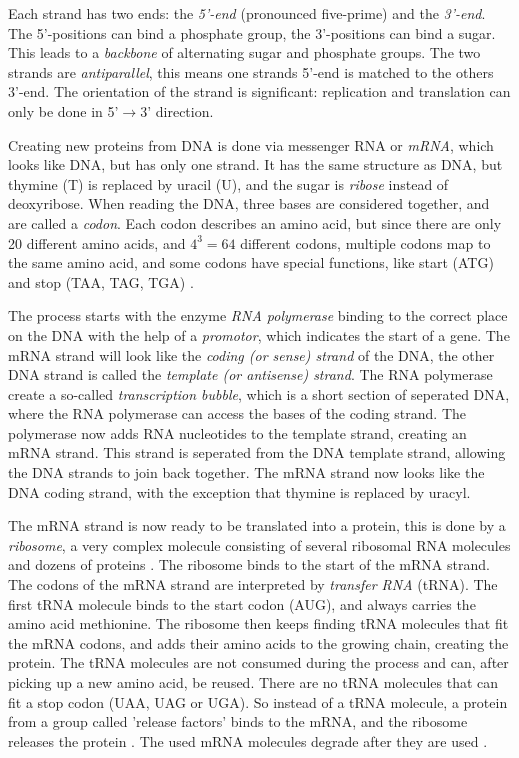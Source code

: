 \documentclass[../main/thesis.tex]{subfiles}
\begin{document}

Each strand has two ends: the \textit{5'-end} (pronounced five-prime) and the \textit{3'-end}.
The 5'-positions can bind a phosphate group, the 3'-positions can bind a sugar.
This leads to a \textit{backbone} of alternating sugar and phosphate groups.
The two strands are \textit{antiparallel}, this means one strands 5'-end is matched to the others 3'-end.
The orientation of the strand is significant: replication and translation can only be done in 5'$\rightarrow$3' direction.

Creating new proteins from DNA is done via messenger RNA or \textit{mRNA}, which looks like DNA, but has only one strand.
It has the same structure as DNA, but thymine (T) is replaced by uracil (U), and the sugar is \textit{ribose} instead of deoxyribose.
When reading the DNA, three bases are considered together, and are called a \textit{codon}.
Each codon describes an amino acid, but since there are only 20 different amino acids, and $4^3=64$ different codons, multiple codons map to the same amino acid, and some codons have special functions, like start (ATG) and stop (TAA, TAG, TGA) \cite{codons}.

The process starts with the enzyme \textit{RNA polymerase} binding to the correct place on the DNA with the help of a \textit{promotor}, which indicates the start of a gene.
The mRNA strand will look like the \textit{coding (or sense) strand} of the DNA, the other DNA strand is called the \textit{template (or antisense) strand}.
The RNA polymerase create a so-called \textit{transcription bubble}, which is a short section of seperated DNA, where the RNA polymerase can access the bases of the coding strand.
The polymerase now adds RNA nucleotides to the template strand, creating an mRNA strand.
This strand is seperated from the DNA template strand, allowing the DNA strands to join back together.
The mRNA strand now looks like the DNA coding strand, with the exception that thymine is replaced by uracyl.

The mRNA strand is now ready to be translated into a protein, this is done by a \textit{ribosome}, a very complex molecule consisting of several ribosomal RNA molecules and dozens of proteins \cite{DNA_translation1}.
The ribosome binds to the start of the mRNA strand.
The codons of the mRNA strand are interpreted by \textit{transfer RNA} (tRNA).
The first tRNA molecule binds to the start codon (AUG), and always carries the amino acid methionine.
The ribosome then keeps finding tRNA molecules that fit the mRNA codons, and adds their amino acids to the growing chain, creating the protein.
The tRNA molecules are not consumed during the process and can, after picking up a new amino acid, be reused.
There are no tRNA molecules that can fit a stop codon (UAA, UAG or UGA).
So instead of a tRNA molecule, a protein from a group called 'release factors' binds to the mRNA, and the ribosome releases the protein \cite{DNA_translation2}.
The used mRNA molecules degrade after they are used \cite{mRNA_degradation}.
\end{document}
